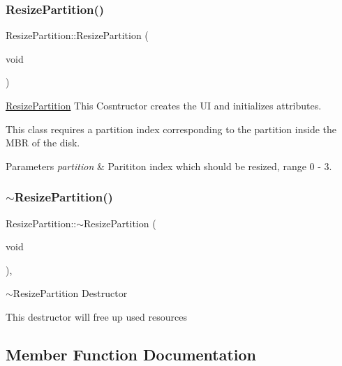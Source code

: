 \subsubsection{\texorpdfstring{Resize\+Partition()}{ResizePartition()}}
{\footnotesize\ttfamily Resize\+Partition\+::\+Resize\+Partition (\begin{DoxyParamCaption}\item[{void}]{ }\end{DoxyParamCaption})}



\mbox{\hyperlink{classui_1_1window_1_1_resize_partition}{Resize\+Partition}} This Cosntructor creates the UI and initializes attributes. 

This class requires a partition index corresponding to the partition inside the M\+BR of the disk. 
\begin{DoxyParams}{Parameters}
{\em partition} & Parititon index which should be resized, range 0 -\/ 3. \\
\hline
\end{DoxyParams}
\mbox{\label{classui_1_1window_1_1_resize_partition_a2e2c8343e7d758f6276ad459424533e9}} 
\subsubsection{\texorpdfstring{$\sim$\+Resize\+Partition()}{~ResizePartition()}}
{\footnotesize\ttfamily Resize\+Partition\+::$\sim$\+Resize\+Partition (\begin{DoxyParamCaption}\item[{void}]{ }\end{DoxyParamCaption})\hspace{0.3cm}{\ttfamily [override]}, {\ttfamily [virtual]}}



$\sim$\+Resize\+Partition Destructor 

This destructor will free up used resources 

\subsection{Member Function Documentation}
\mbox{\label{classui_1_1window_1_1_resize_partition_a82f2b0a7f31c72e0ea6176415ddb855c}} 
